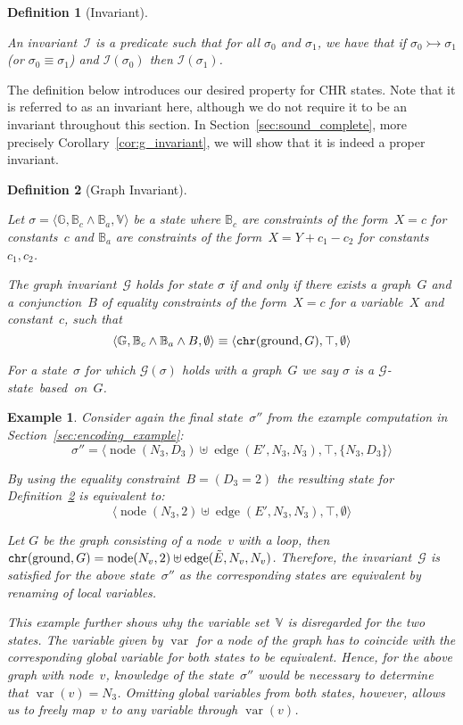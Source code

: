 \documentclass{tlp}
\newtheorem{example}{Example}[section]
\newtheorem{definition}{Definition}[section]
\newcommand{\st}[3]{\ensuremath{\langle #1 , #2 , #3 \rangle}}
\newcommand{\mcI}{\ensuremath{\mathcal{I}}}
\newcommand{\mcG}{\ensuremath{\mathcal{G}}}
\newcommand{\bbB}{\ensuremath{\mathbb{B}}}
\newcommand{\bbG}{\ensuremath{\mathbb{G}}}
\newcommand{\bbV}{\ensuremath{\mathbb{V}}}
\newcommand{\der}{\ensuremath{\rightarrowtail}}
\DeclareMathOperator{\var}{var}
\DeclareMathOperator{\gnd}{ground}
\DeclareMathOperator{\node}{node}
\DeclareMathOperator{\edge}{edge}
\newcommand{\chr}{\ensuremath{{\tt chr}}}
\begin{document}
\begin{definition}[Invariant]\label{def:invariant}

An \emph{invariant}~$\mcI$ is a predicate such that for all $\sigma_0$ and
$\sigma_1$, we have that if $\sigma_0 \der \sigma_1$ (or $\sigma_0 \equiv
\sigma_1$) and $\mcI(\sigma_0)$ then $\mcI(\sigma_1)$.
\end{definition}

The definition below introduces our desired property for CHR states. Note that it
is referred to as an invariant here, although we do not require it to be an
invariant throughout this section. In Section~\ref{sec:sound_complete}, more
precisely Corollary~\ref{cor:g_invariant}, we will show that it is indeed a
proper invariant.

\begin{definition}[Graph Invariant]\label{def:inv_graph}

Let $\sigma = \st{\bbG}{\bbB_c \land \bbB_a}{\bbV}$ be a state where $\bbB_c$ are
constraints of the form~$X=c$ for constants~$c$ and $\bbB_a$ are constraints of
the form~$X=Y{+}c_1{-}c_2$ for constants~$c_1,c_2$.

The \emph{graph invariant}~$\mcG$ holds for state $\sigma$ if and only if there
exists a graph~$G$ and a conjunction~$B$ of equality constraints of the
form~$X=c$ for a variable~$X$ and constant~$c$, such that \[ \st{\bbG}{\bbB_c
\land \bbB_a \land B}{\emptyset} \equiv \st{\chr(\gnd, G)}{\top}{\emptyset}\]

For a state~$\sigma$ for which $\mcG(\sigma)$ holds with a graph~$G$ we say
$\sigma$ is a $\mcG$-\emph{state~based~on}~$G$.
\end{definition}

\begin{example}

Consider again the final state~$\sigma''$ from the example computation in
Section~\ref{sec:encoding_example}:
\[
\sigma'' = \st{\node(N_3,D_3) \uplus \edge(E', N_3, N_3)}{\top}{\{N_3,D_3\}}
\]

By using the equality constraint~$B = (D_3 = 2)$ the resulting state for
Definition~\ref{def:inv_graph} is equivalent to: \[
\st{\node(N_3,2) \uplus \edge(E', N_3, N_3)}{\top}{\emptyset}
\]

Let $G$ be the graph consisting of a node~$v$ with a loop, then $\chr(\gnd, G) =
\node(N_v, 2) \uplus \edge(\tilde{E}, N_v, N_v)$. Therefore, the invariant~$\mcG$
is satisfied for the above state~$\sigma''$ as the corresponding states are
equivalent by renaming of local variables.

This example further shows why the variable set~$\bbV$ is disregarded for the two
states. The variable given by $\var$ for a node of the graph has to coincide with
the corresponding global variable for both states to be equivalent. Hence, for
the above graph with node~$v$, knowledge of the state~$\sigma''$ would be
necessary to determine that $\var(v) = N_3$. Omitting global variables from both
states, however, allows us to freely map~$v$ to any variable through $\var(v)$.
\end{example}
\end{document}
